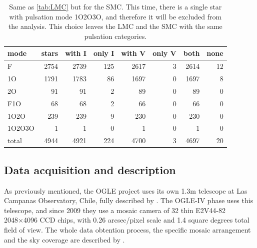 \begin{table}
	\centering
	\begin{tabular}{l|rrrrrrr}
		mode &     stars &  with I & only I & with V & only V & both &  none \\ \hline\hline
		F      &  2754 &  2739 &       125 &  2617 &         3 &  2614 &    12 \\
		1O     &  1791 &  1783 &        86 &  1697 &         0 &  1697 &     8 \\
		2O     &    91 &    91 &         2 &    89 &         0 &    89 &     0 \\
		F1O    &    68 &    68 &         2 &    66 &         0 &    66 &     0 \\
		1O2O   &   239 &   239 &         9 &   230 &         0 &   230 &     0 \\
		1O2O3O &     1 &     1 &         0 &     1 &         0 &     1 &     0 \\\hline
		total  &  4944 &  4921 &       224 &  4700 &         3 &  4697 &    20 \\
	\end{tabular}
	\caption[Pulsation mode and filter data distribution for the LMC]{
		Same as \autoref{tab:LMC} but for the SMC. 
		This time, there is a single star with pulsation mode 1O2O3O,
		and therefore it will be excluded from the analysis.
		This choice leaves the LMC and the SMC with the same pulsation categories.
	}
	\label{tab:SMC}
\end{table}

\subsection{Data acquisition and description \label{sec:data}}


As previously mentioned, the OGLE project uses its own 1.3m telescope at Las Campanas Observatory, Chile,
fully described by \cite{OGLEIIinstrumentation}. 
The OGLE-IV phase uses this telescope, and since 2009 they use a mosaic camera of 32 thin E2V44-82 2048×4096 CCD chips,
with 0.26 arcsec/pixel scale and 1.4 square degrees total field of view.
The whole data obtention process, the specific mosaic arrangement and the sky coverage are described by \cite{OGLE2015}.

